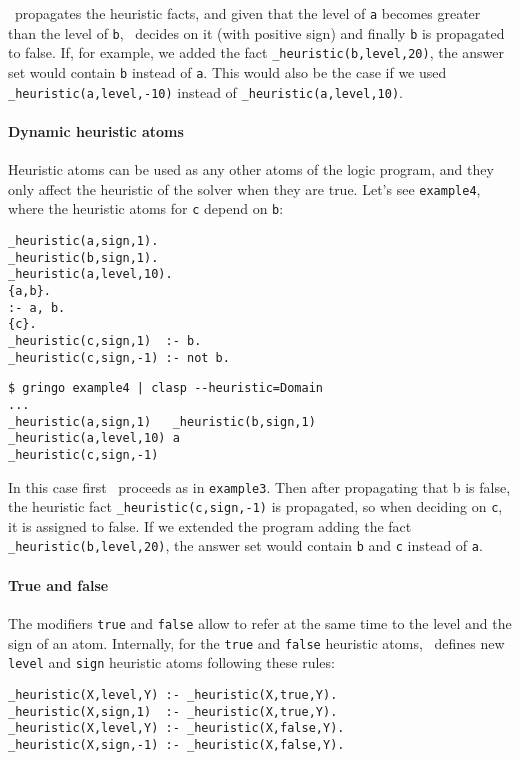 \clasp\ propagates the heuristic facts, and given that the level of \texttt{a} becomes greater than the level of \texttt{b},
\clasp\ decides on it (with positive sign) and finally \texttt{b} is propagated to false.
If, for example, we added the fact \texttt{\_heuristic(b,level,20)},  the answer set would contain \texttt{b} instead of \texttt{a}.
This would also be the case if we used \texttt{\_heuristic(a,level,-10)} instead of \texttt{\_heuristic(a,level,10)}.

\paragraph{Dynamic heuristic atoms}

Heuristic atoms can be used as any other atoms of the logic program,
and they only affect the heuristic of the solver when they are true.
Let's see \texttt{example4}, where the heuristic atoms for \texttt{c} depend on \texttt{b}:
\begin{lstlisting}[numbers=none]
_heuristic(a,sign,1).
_heuristic(b,sign,1).
_heuristic(a,level,10).
{a,b}.
:- a, b.
{c}.
_heuristic(c,sign,1)  :- b.
_heuristic(c,sign,-1) :- not b.
\end{lstlisting}
\begin{lstlisting}[numbers=none]
$ gringo example4 | clasp --heuristic=Domain
...
_heuristic(a,sign,1)   _heuristic(b,sign,1)
_heuristic(a,level,10) a
_heuristic(c,sign,-1)\end{lstlisting}

In this case first \clasp\ proceeds as in \texttt{example3}.
Then after propagating that b is false,  the heuristic fact \texttt{\_heuristic(c,sign,-1)} is propagated,
so when deciding on \texttt{c}, it is assigned to false.  If we extended the program adding the fact \texttt{\_heuristic(b,level,20)},
the answer set would contain \texttt{b} and \texttt{c} instead of \texttt{a}.

\paragraph{True and false}

 The modifiers \texttt{true} and \texttt{false} allow to refer at the same time to the level and the sign of an atom.
 Internally,  for the \texttt{true} and \texttt{false} heuristic atoms,
 \clasp\ defines new \texttt{level} and \texttt{sign} heuristic atoms following these rules:
\begin{lstlisting}[numbers=none]
_heuristic(X,level,Y) :- _heuristic(X,true,Y).
_heuristic(X,sign,1)  :- _heuristic(X,true,Y).
_heuristic(X,level,Y) :- _heuristic(X,false,Y).
_heuristic(X,sign,-1) :- _heuristic(X,false,Y).
\end{lstlisting}

